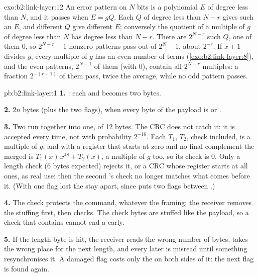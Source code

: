 \begin{solution}{exo:b2:link-layer:12}
An error pattern on $N$ bits is a polynomial $E$ of degree less than $N$, and it passes when $E = gQ$. Each $Q$ of
degree less than $N - r$ gives such an $E$, and different $Q$ give different $E$; conversely the quotient of a
multiple of $g$ of degree less than $N$ has degree less than $N - r$. There are $2^{N-r}$ such $Q$, one of them 0, so
$2^{N-r} - 1$ nonzero patterns pass out of $2^N - 1$, about $2^{-r}$. If $x + 1$ divides $g$, every multiple of $g$
has an even number of terms (\cref{exo:b2:link-layer:8}), and the even patterns, $2^{N-1}$ of them (with 0), contain
all $2^{N-r}$ multiples: a fraction $2^{-(r-1)}$ of them pass, twice the average, while no odd pattern passes.
\end{solution}

\begin{solution}{pb:b2:link-layer:1}
\textbf{1.} : each  and  becomes two bytes.

\textbf{2.} $2n$ bytes (plus the two flags), when every byte of the payload is  or .

\textbf{3.} Two  run together into one, of 12 bytes. The CRC does not catch it: it is accepted every time, not
with probability $2^{-16}$. Each  $T_1$, $T_2$, check included, is a multiple of $g$, and with a register that
starts at zero and no final complement the merged  is $T_1(x)\,x^{48} + T_2(x)$, a multiple of $g$ too, so its
check is 0. Only a length check (6 bytes expected) rejects it, or a CRC whose register starts at all ones, as real
 use: then the second 's check no longer matches what comes before it. (With one flag lost the  stay
apart, since  puts two flags between .)

\textbf{4.} The check protects the command, whatever the framing; the receiver removes the stuffing first, then
checks. The check bytes are stuffed like the payload, so a check that contains  cannot end a  early.

\textbf{5.} If the length byte is hit, the receiver reads the wrong number of bytes, takes the wrong place for the
next length, and every later  is misread until something resynchronises it. A damaged flag costs only the 
on both sides of it: the next flag is found again.


\end{solution}
